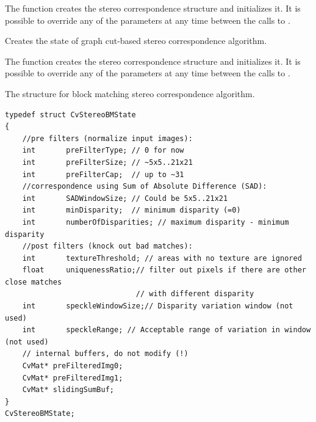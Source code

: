 \begin{description}
\end{description}

The function creates the stereo correspondence structure and initializes it. It is possible to override any of the parameters at any time between the calls to .

Creates the state of graph cut-based stereo correspondence algorithm.


\begin{description}
\end{description}

The function creates the stereo correspondence structure and initializes it. It is possible to override any of the parameters at any time between the calls to .

The structure for block matching stereo correspondence algorithm.

\begin{lstlisting}
typedef struct CvStereoBMState
{
    //pre filters (normalize input images):
    int       preFilterType; // 0 for now
    int       preFilterSize; // ~5x5..21x21
    int       preFilterCap;  // up to ~31
    //correspondence using Sum of Absolute Difference (SAD):
    int       SADWindowSize; // Could be 5x5..21x21
    int       minDisparity;  // minimum disparity (=0)
    int       numberOfDisparities; // maximum disparity - minimum disparity
    //post filters (knock out bad matches):
    int       textureThreshold; // areas with no texture are ignored
    float     uniquenessRatio;// filter out pixels if there are other close matches
                              // with different disparity
    int       speckleWindowSize;// Disparity variation window (not used)
    int       speckleRange; // Acceptable range of variation in window (not used)
    // internal buffers, do not modify (!)
    CvMat* preFilteredImg0;
    CvMat* preFilteredImg1;
    CvMat* slidingSumBuf;
}
CvStereoBMState;
\end{lstlisting}

